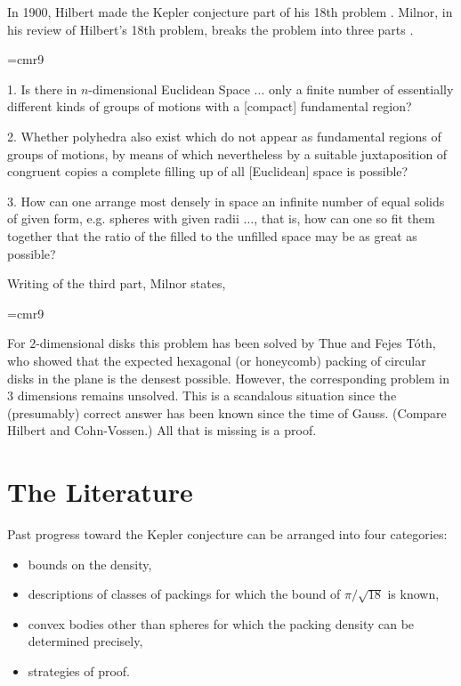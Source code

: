 In 1900, Hilbert made the Kepler conjecture part of his 18th problem
\cite{Hil01}.
Milnor, in his review of Hilbert's 18th problem, breaks the problem
into three parts \cite{Mil76}.

{
\narrower
\font\ninerm=cmr9
\ninerm

1.  Is there in $n$-dimensional Euclidean Space $\ldots$ only a finite
number of essentially different kinds of groups of motions with a
[compact] fundamental region?

2.  Whether polyhedra also exist which do not appear as fundamental
    regions of groups of motions, by means of which nevertheless
    by a suitable juxtaposition of congruent copies a complete filling
    up of all [Euclidean] space is possible?

3.  How can one arrange most densely in space an infinite number
    of equal solids of given form, e.g. spheres with given radii $\ldots$,
    that is, how can one so fit them together that the ratio of the
    filled to the unfilled space may be as great as possible?

}

\smallskip
Writing of the third part, Milnor states,

{
\narrower
\font\ninerm=cmr9
\ninerm

For $2$-dimensional disks
this problem has been solved by Thue and Fejes T\'oth, who showed
that the expected hexagonal (or honeycomb) packing of circular disks
in the plane is the densest possible.  However, the corresponding
problem in $3$ dimensions remains unsolved.  This is a scandalous
situation since the (presumably) correct answer has been known since
the time of Gauss. (Compare Hilbert and Cohn-Vossen.)  All that is
missing is a proof.

}

\section{The Literature}

Past progress toward the Kepler conjecture can be arranged into
four categories:
\begin{itemize}
    \item bounds on the density,
    \item descriptions of classes of packings for
which the bound of $\pi/\sqrt{18}$ is known,
    \item convex bodies other
than spheres for which the packing density can be determined
precisely,
    \item strategies of proof.
\end{itemize}

